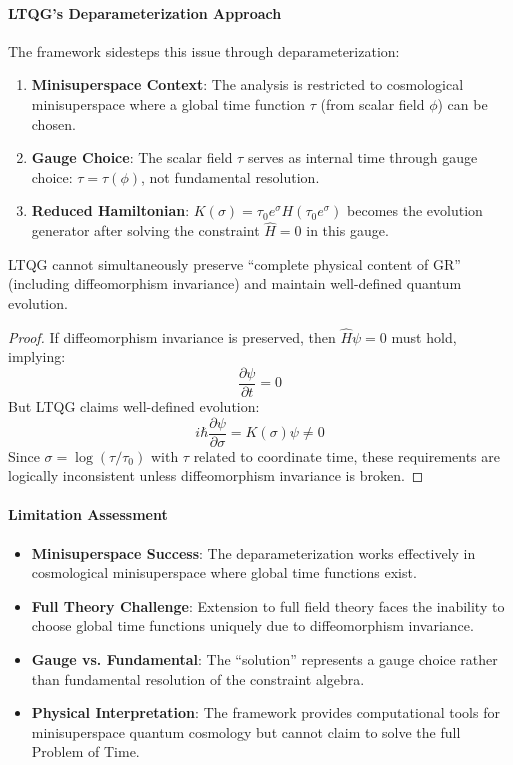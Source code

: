 \paragraph{LTQG's Deparameterization Approach}
The framework sidesteps this issue through deparameterization:
\begin{enumerate}
\item \textbf{Minisuperspace Context}: The analysis is restricted to cosmological minisuperspace where a global time function $\tau$ (from scalar field $\phi$) can be chosen.
\item \textbf{Gauge Choice}: The scalar field $\tau$ serves as internal time through gauge choice: $\tau = \tau(\phi)$, not fundamental resolution.
\item \textbf{Reduced Hamiltonian}: $K(\sigma) = \tau_0 e^\sigma H(\tau_0 e^\sigma)$ becomes the evolution generator after solving the constraint $\hat{H} = 0$ in this gauge.
\end{enumerate}

\begin{proposition}
\label{prop:logical_inconsistency}
LTQG cannot simultaneously preserve ``complete physical content of GR'' (including diffeomorphism invariance) and maintain well-defined quantum evolution.
\end{proposition}

\begin{proof}
If diffeomorphism invariance is preserved, then $\hat{H} \psi = 0$ must hold, implying:
\begin{equation}
\frac{\partial \psi}{\partial t} = 0
\end{equation}
But LTQG claims well-defined evolution:
\begin{equation}
i\hbar \frac{\partial \psi}{\partial \sigma} = K(\sigma) \psi \neq 0
\end{equation}
Since $\sigma = \log(\tau/\tau_0)$ with $\tau$ related to coordinate time, these requirements are logically inconsistent unless diffeomorphism invariance is broken.
\end{proof}

\paragraph{Limitation Assessment}
\begin{itemize}
\item \textbf{Minisuperspace Success}: The deparameterization works effectively in cosmological minisuperspace where global time functions exist.
\item \textbf{Full Theory Challenge}: Extension to full field theory faces the inability to choose global time functions uniquely due to diffeomorphism invariance.
\item \textbf{Gauge vs. Fundamental}: The ``solution'' represents a gauge choice rather than fundamental resolution of the constraint algebra.
\item \textbf{Physical Interpretation}: The framework provides computational tools for minisuperspace quantum cosmology but cannot claim to solve the full Problem of Time.
\end{itemize}

